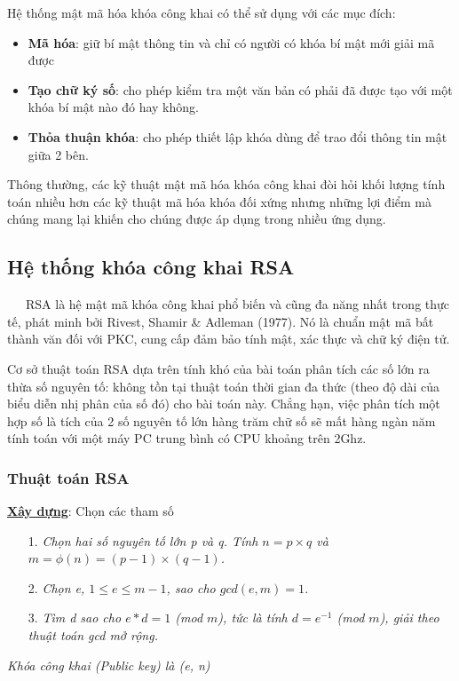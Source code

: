 \documentclass[a4paper,12pt]{report}
\begin{document}
Hệ thống mật mã hóa khóa công khai có thể sử dụng với các mục đích:
\begin{itemize}
\item \textbf{Mã hóa}: giữ bí mật thông tin và chỉ có người có khóa bí mật mới giải mã được
\item \textbf{Tạo chữ ký số}: cho phép kiểm tra một văn bản có phải đã được tạo với một khóa bí mật nào đó hay không.
\item \textbf{Thỏa thuận khóa}: cho phép thiết lập khóa dùng để trao đổi thông tin mật giữa 2 bên.
\end{itemize}

Thông thường, các kỹ thuật mật mã hóa khóa công khai đòi hỏi khối lượng tính toán nhiều hơn các kỹ thuật mã hóa khóa đối xứng nhưng những lợi điểm mà chúng mang lại khiến cho chúng được áp dụng trong nhiều ứng dụng.
\subsection*{Hệ thống khóa công khai RSA}
\ \ \ RSA là hệ mật mã khóa công khai phổ biến và cũng đa năng nhất trong thực tế,
phát minh bởi Rivest, Shamir \& Adleman (1977). Nó là chuẩn mật mã bất thành văn đối với PKC, cung cấp đảm bảo tính mật, xác thực và chữ ký điện tử.

Cơ sở thuật toán RSA dựa trên tính khó của bài toán phân tích các số lớn ra thừa số nguyên tố: không tồn tại thuật toán thời gian đa thức (theo độ dài của biểu diễn nhị phân của số đó) cho bài toán này. Chẳng hạn, việc phân tích một hợp số là tích của 2 số nguyên tố lớn hàng trăm chữ số sẽ mất hàng ngàn năm tính toán với một máy PC trung bình có CPU khoảng trên 2Ghz.
\subsubsection{Thuật toán RSA}
\textbf{\underline{Xây dựng}}: Chọn các tham số
\begin{itemize}
\item[1. ] \textit{Chọn hai số nguyên tố lớn p và q. Tính $n = p \times q$ và $m = \phi(n) = (p - 1) \times (q - 1)$.}
\item[2. ] \textit{Chọn e, $1 \leq e \leq m -1$, sao cho $gcd(e, m) = 1$.}
\item[3. ] \textit{Tìm d sao cho $e * d = 1$ (mod $m$), tức là tính $d = e^{-1}$
(mod $m$), giải theo thuật toán gcd mở rộng.}
\end{itemize}

\textit{Khóa công khai (Public key) là (e, n)}
\end{document}
